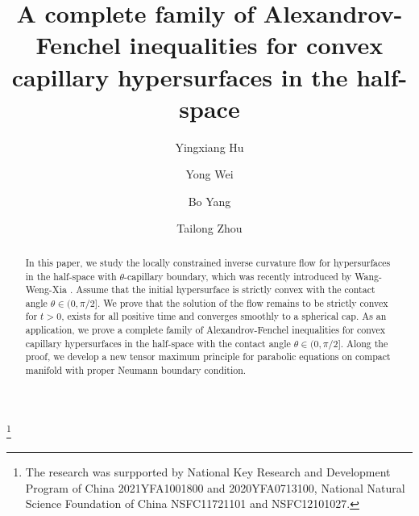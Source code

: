 \documentclass[11pt,reqno]{amsart}
\theoremstyle{definition}
\theoremstyle{remark}
\numberwithin{equation}{section}
\renewcommand{\(}{\left(}
\renewcommand{\)}{\right)}
\renewcommand{\-}{\overline}
\begin{document}
	\title[Alexandrov-Fenchel inequalities in the half-space]{A complete family of Alexandrov-Fenchel inequalities for convex capillary hypersurfaces in the half-space}	
\author[Y. Hu]{Yingxiang Hu}
\address{School of Mathematical Sciences, Beihang University, Beijing 100191, P.R. China}
\author[Y. Wei]{Yong Wei}
\address{School of Mathematical Sciences, University of Science and Technology of China, Hefei 230026, P.R. China}
\author[B. Yang]{Bo Yang}
\address{Department of Mathematical Sciences, Tsinghua University, Beijing 100084, P.R. China}
\author[T. Zhou]{Tailong Zhou}
\address{School of Mathematics, Sichuan University, Chengdu 610065, Sichuan, P.R. China}
	
\thanks{The research was surpported by National Key Research and Development Program of China 2021YFA1001800 and 2020YFA0713100, National Natural Science Foundation of China NSFC11721101 and NSFC12101027.
}
	\begin{abstract}
In this paper, we study the locally constrained inverse curvature flow for hypersurfaces  in the half-space with $\theta$-capillary boundary, which was recently introduced by Wang-Weng-Xia \cite{Wang-Weng-Xia2022}. Assume that the initial hypersurface is strictly convex with the contact angle $\theta\in (0,\pi/2]$. We prove that the solution of the flow remains to be strictly convex for $t>0$, exists for all positive time and converges smoothly to a spherical cap. As an application, we prove a complete family of Alexandrov-Fenchel inequalities for convex capillary hypersurfaces in the half-space with the contact angle $\theta\in(0,\pi/2]$.
Along the proof, we develop a new tensor maximum principle for parabolic equations on compact manifold with proper Neumann boundary condition.
	\end{abstract}	
	\maketitle
		\tableofcontents
\end{document}
